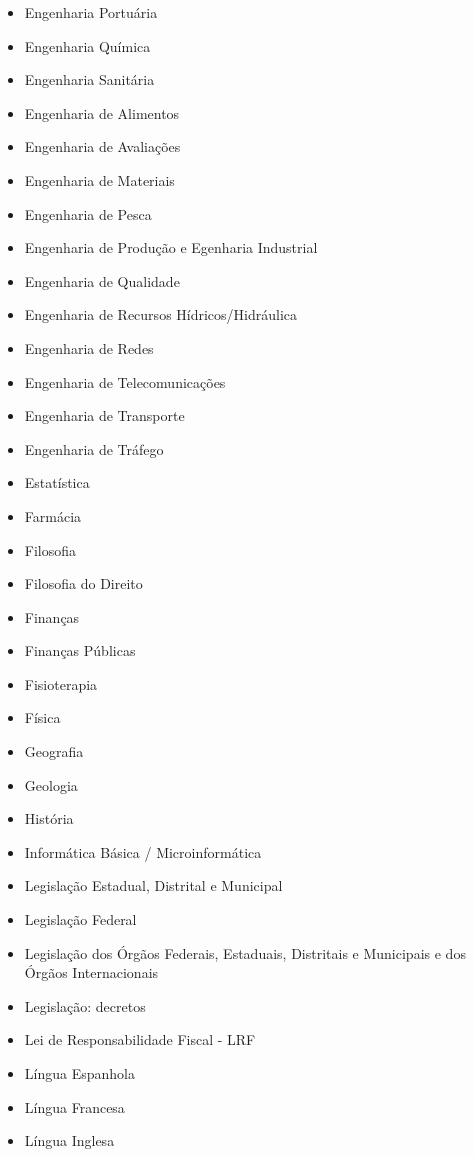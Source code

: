 \begin{multicols}{2}
\begin{itemize}
        \item Engenharia Portuária
        \item Engenharia Química
        \item Engenharia Sanitária
        \item Engenharia de Alimentos
        \item Engenharia de Avaliações
        \item Engenharia de Materiais
        \item Engenharia de Pesca
        \item Engenharia de Produção e Egenharia Industrial
        \item Engenharia de Qualidade
        \item Engenharia de Recursos Hídricos/Hidráulica
        \item Engenharia de Redes
        \item Engenharia de Telecomunicações
        \item Engenharia de Transporte
        \item Engenharia de Tráfego
        \item Estatística
        \item Farmácia
        \item Filosofia
        \item Filosofia do Direito
        \item Finanças
        \item Finanças Públicas
        \item Fisioterapia
        \item Física
        \item Geografia
        \item Geologia
        \item História
        \item Informática Básica / Microinformática
        \item Legislação Estadual, Distrital e Municipal
        \item Legislação Federal
        \item Legislação dos Órgãos Federais, Estaduais, Distritais e Municipais e dos Órgãos Internacionais
        \item Legislação: decretos
        \item Lei de Responsabilidade Fiscal - LRF
        \item Língua Espanhola
        \item Língua Francesa
        \item Língua Inglesa

\end{itemize}
\end{multicols}
